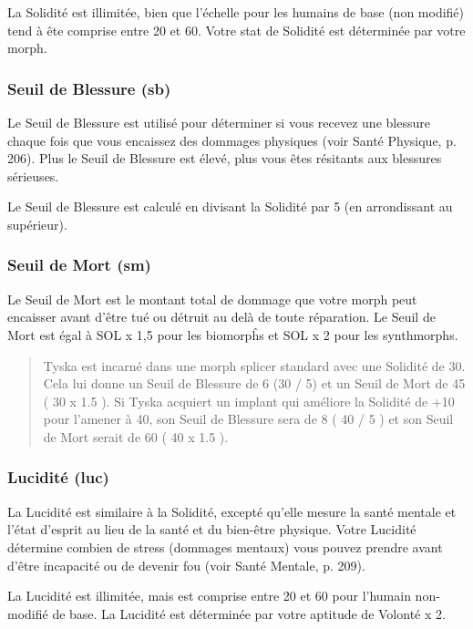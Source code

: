 La Solidité est illimitée, bien que l'échelle pour les humains de base (non modifié) tend à ête comprise entre 20 et 60. Votre stat de Solidité est déterminée par votre morph. 

\subsubsection{Seuil de Blessure (sb)} \label{sec:wound-threshold-wt} 

Le Seuil de Blessure est utilisé pour déterminer si vous recevez une blessure chaque fois que vous encaissez des dommages physiques (voir Santé Physique, p. 206). Plus le Seuil de Blessure est élevé, plus vous êtes résitants aux blessures sérieuses. 

Le Seuil de Blessure est calculé en divisant la Solidité par 5 (en arrondissant au supérieur). 

\subsubsection{Seuil de Mort (sm)} \label{sec:death-rating-dr} 

Le Seuil de Mort est le montant total de dommage que votre morph peut encaisser avant d'être tué ou détruit au delà de toute réparation. Le Seuil de Mort est égal à SOL x 1,5 pour les biomorpĥs et SOL x 2 pour les synthmorphs. 

\begin{quotation} Tyska est incarné dans une morph splicer standard avec une Solidité de 30. Cela lui donne un Seuil de Blessure de 6 (30 / 5) et un Seuil de Mort de 45 ( 30 x 1.5 ). Si Tyska acquiert un implant qui améliore la Solidité de +10 pour l'amener à 40, son Seuil de Blessure sera de 8 ( 40 / 5 ) et son Seuil de Mort serait de 60 ( 40 x 1.5 ). \end{quotation} 

\subsubsection{Lucidité (luc)} \label{sec:lucidity-luc} 

La Lucidité est similaire à la Solidité, excepté qu'elle mesure la santé mentale et l'état d'esprit au lieu de la santé et du bien-être physique. Votre Lucidité détermine combien de stress (dommages mentaux) vous pouvez prendre avant d'être incapacité ou de devenir fou (voir Santé Mentale, p. 209). 

La Lucidité est illimitée, mais est comprise entre 20 et 60 pour l'humain non-modifié de base. La Lucidité est déterminée par votre aptitude de Volonté x 2. 

